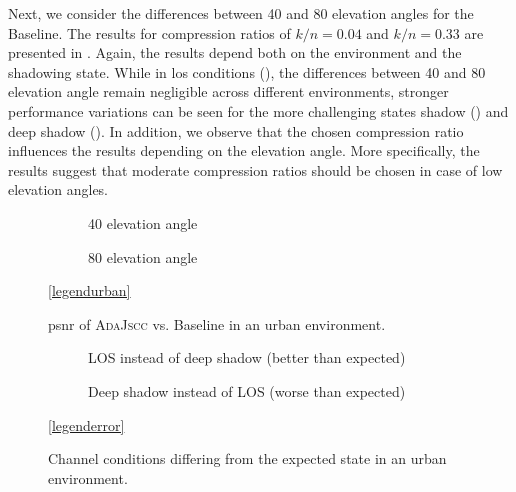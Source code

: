 \documentclass[conference]{IEEEtran}
\newcommand\ours{\textsc{AdaJscc}\xspace}
\newcommand\baseline{Baseline\xspace}
\begin{document}
Next, we consider the differences between 40\textdegree{} and 80\textdegree{} elevation angles for the \baseline. 
The results for compression ratios of $k/n = 0.04$ and $k/n = 0.33$ are presented in .
Again, the results depend both on the environment and the shadowing state.
While in \ac{los} conditions (), the differences between 40\textdegree{} and 80\textdegree{} elevation angle remain negligible across different environments, 
stronger performance variations can be seen for the more challenging states shadow () and deep shadow ().
In addition, we observe that the chosen compression ratio influences the results depending on the elevation angle.
More specifically, the results suggest that moderate compression ratios should be chosen in case of low elevation angles.


\begin{figure}
  \begin{subfigure}{.48\linewidth}
  \centering
  
  \caption{40\textdegree{} elevation angle}
\end{subfigure}
\hfill
\begin{subfigure}{.48\linewidth}
  \centering
  
  \caption{80\textdegree{} elevation angle}
\end{subfigure}

\vspace{1em}
\centering
\ref{legendurban}

\caption{\ac{psnr} of \ours vs. \baseline in an urban environment.}
\label{fig:af_vs_no_af}
\end{figure}

\begin{figure}[t!]
  \begin{subfigure}{.48\linewidth}
  \centering
  
  \caption{LOS instead of deep shadow (better than expected)}
  \label{fig:different_state_same_snr_better}
\end{subfigure}
\hfill
\begin{subfigure}{.48\linewidth}
  \centering
  
  \caption{Deep shadow instead of LOS (worse than expected)}
  \label{fig:different_state_same_snr_worse}
\end{subfigure}

\vspace{1em}
\centering
\ref{legenderror}

\caption{Channel conditions differing from the expected state in an urban environment.}
\label{fig:different_state_same_snr}
\end{figure}
\end{document}

